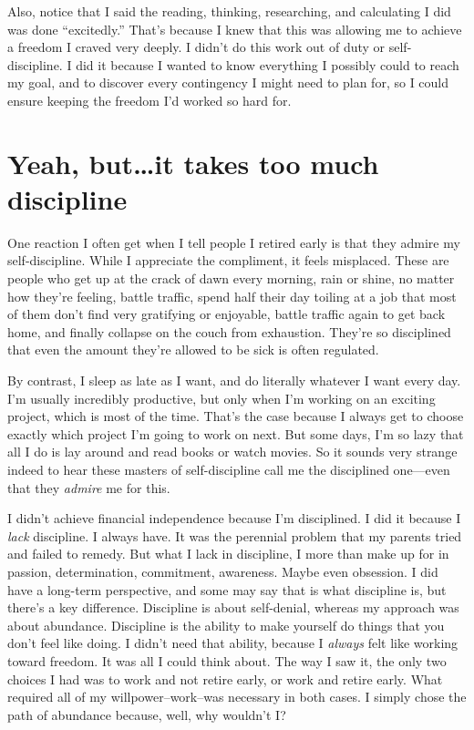 Also, notice that I said the reading, thinking, researching, and calculating I did was done ``excitedly.'' That's because I knew that this was allowing me to achieve a freedom I craved very deeply. I didn't do this work out of duty or self-discipline. I did it because I wanted to know everything I possibly could to reach my goal, and to discover every contingency I might need to plan for, so I could ensure keeping the freedom I'd worked so hard for.

\section{Yeah, but\ldots it takes too much discipline}
One reaction I often get when I tell people I retired early is that they admire my self-discipline. While I appreciate the compliment, it feels misplaced. These are people who get up at the crack of dawn every morning, rain or shine, no matter how they're feeling, battle traffic, spend half their day toiling at a job that most of them don't find very gratifying or enjoyable, battle traffic again to get back home, and finally collapse on the couch from exhaustion. They're so disciplined that even the amount they're allowed to be sick is often regulated.

By contrast, I sleep as late as I want, and do literally whatever I want every day. I'm usually incredibly productive, but only when I'm working on an exciting project, which is most of the time. That's the case because I always get to choose exactly which project I'm going to work on next. But some days, I'm so lazy that all I do is lay around and read books or watch movies. So it sounds very strange indeed to hear these masters of self-discipline call me the disciplined one---even that they \emph{admire} me for this.

I didn't achieve financial independence because I'm disciplined. I did it because I \emph{lack} discipline. I always have. It was the perennial problem that my parents tried and failed to remedy. But what I lack in discipline, I more than make up for in passion, determination, commitment, awareness. Maybe even obsession. I did have a long-term perspective, and some may say that is what discipline is, but there's a key difference. Discipline is about self-denial, whereas my approach was about abundance. Discipline is the ability to make yourself do things that you don't feel like doing. I didn't need that ability, because I \emph{always} felt like working toward freedom. It was all I could think about. The way I saw it, the only two choices I had was to work and not retire early, or work and retire early. What required all of my willpower–work–was necessary in both cases. I simply chose the path of abundance because, well, why wouldn't I?

